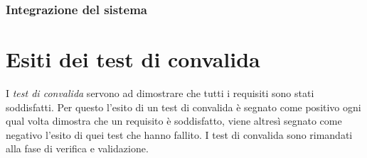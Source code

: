 \subsection{Integrazione del sistema}

\chapter{Esiti dei test di convalida}
I \textit{test di convalida} servono ad dimostrare che tutti i requisiti sono stati soddisfatti. Per questo l'esito di un test di convalida \`e segnato come positivo ogni qual volta dimostra che un requisito \`e soddisfatto, viene altres\`i segnato come negativo l'esito di quei test che hanno fallito.
I test di convalida sono rimandati alla fase di verifica e validazione.

